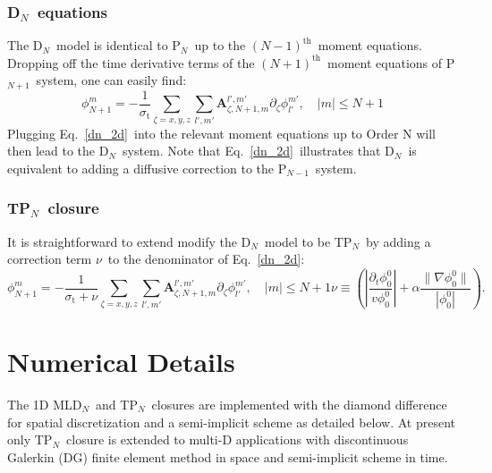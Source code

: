 \documentclass[review]{elsarticle}
\newcommand{\st}{\sigma_\mathrm{t}}
\newcommand{\pn}{P$_N$}
\newcommand{\dn}{D$_N$}
\begin{document}
{
\subsubsection{\dn\ equations}
The \dn\ model is identical to \pn\ up to the $(N-1)^\mathrm{th}$\ moment equations. Dropping off the time derivative terms of the $(N+1)^\mathrm{th}$\ moment equations of P$_{N+1}$\ system, one can easily find:
	\begin{equation}\label{dn_2d}
	\phi_{N+1}^m=-\frac{1}{\st}\sum\limits_{\zeta=x,y,z}\sum\limits_{l',m'}\mathbf{A}_{\zeta,N+1,m}^{l',m'}\partial_\zeta\phi_{l'}^{m'},\quad |m|\leq N+1
	\end{equation} 
Plugging Eq.\ \eqref{dn_2d}\ into the relevant moment equations up to Order N will then lead to the \dn\ system. Note that Eq.\ \eqref{dn_2d}\ illustrates that \dn\ is equivalent to adding a diffusive correction to the P$_{N-1}$\ system\cite{levermoredn}.
\subsubsection{T\pn\ closure}
It is straightforward to extend modify the \dn\ model to be T\pn\ by adding a correction term $\nu$\ to the denominator of Eq.\ \eqref{dn_2d}:
	\begin{subequations}
		\begin{equation}\label{tpn_2d}
		\phi_{N+1}^m=-\frac{1}{\st+\nu}\sum\limits_{\zeta=x,y,z}\sum\limits_{l',m'}\mathbf{A}_{\zeta,N+1,m}^{l',m'}\partial_\zeta\phi_{l'}^{m'},\quad |m|\leq N+1
		\end{equation}
		\begin{equation}\label{viscosity}
		\nu\equiv\left(\left|\frac{\partial_t\phi_0^0}{v\phi_0^0}\right|+\alpha\frac{\|\nabla\phi_0^0\|}{|\phi_0^0|}\right).
		\end{equation}
	\end{subequations}
	}

\section{Numerical Details} %
{
The 1D ML\dn\ and T\pn\ closures are implemented with the diamond difference for spatial discretization and a semi-implicit scheme as detailed below. At present only T\pn\ closure is extended to multi-D applications with discontinuous Galerkin (DG) finite element method in space and semi-implicit scheme in time.
	}
\end{document}
